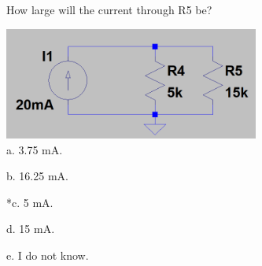 
How large will the current through R5 be?

\includegraphics[width=3.30515in,height=1.45313in]{../../Images/KirchhoffsLawsQ5.png}\\

a. 3.75 mA.

b. 16.25 mA.

*c. 5 mA.

d. 15 mA.

e. I do not know.\\
